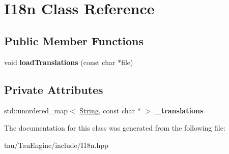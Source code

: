 \hypertarget{class_i18n}{}\section{I18n Class Reference}
\label{class_i18n}
\subsection*{Public Member Functions}
\begin{DoxyCompactItemize}
\item 
\mbox{\label{class_i18n_a7567052f24dfcba57fc2a88b67720199}} 
void {\bfseries load\+Translations} (const char $\ast$file)
\end{DoxyCompactItemize}
\subsection*{Private Attributes}
\begin{DoxyCompactItemize}
\item 
\mbox{\label{class_i18n_ae8e0a657d30a2f3acecaa0c531719ada}} 
std\+::unordered\+\_\+map$<$ \mbox{\hyperlink{class_string}{String}}, const char $\ast$ $>$ {\bfseries \+\_\+translations}
\end{DoxyCompactItemize}


The documentation for this class was generated from the following file\+:\begin{DoxyCompactItemize}
\item 
tau/\+Tau\+Engine/include/I18n.\+hpp\end{DoxyCompactItemize}
